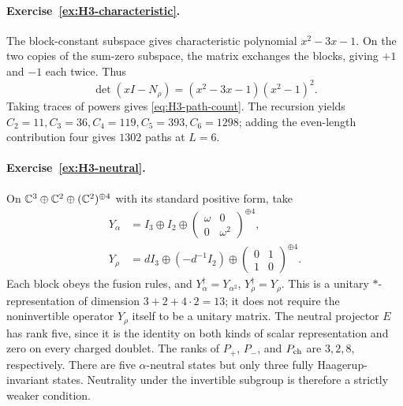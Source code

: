 \paragraph{Exercise~\ref{ex:H3-characteristic}.}
\label{sol:ex:H3-characteristic}
The block-constant subspace gives characteristic polynomial
$x^2-3x-1$.  On the two copies of the sum-zero subspace, the
matrix exchanges the blocks, giving $+1$ and $-1$ each twice.
Thus
\[
 \det(xI-N_\rho)=(x^2-3x-1)(x^2-1)^2.
\]
Taking traces of powers gives \eqref{eq:H3-path-count}.
The recursion yields
$C_2=11,C_3=36,C_4=119,C_5=393,C_6=1298$; adding the
even-length contribution four gives $1302$ paths at $L=6$.



\paragraph{Exercise~\ref{ex:H3-neutral}.}
\label{sol:ex:H3-neutral}
On $\mathbb C^3\oplus\mathbb C^2\oplus(\mathbb C^2)^{\oplus4}$ with its standard
positive form, take
\begin{align*}
 Y_\alpha&=I_3\oplus I_2\oplus
     \begin{pmatrix}\omega&0\\0&\omega^2\end{pmatrix}^{\oplus4},\\
 Y_\rho&=dI_3\oplus(-d^{-1}I_2)\oplus
     \begin{pmatrix}0&1\\1&0\end{pmatrix}^{\oplus4}.
\end{align*}
Each block obeys the fusion rules, and
$Y_\alpha^\dagger=Y_{\alpha^2}$, $Y_\rho^\dagger=Y_\rho$.
This is a unitary $*$-representation of dimension
$3+2+4\cdot2=13$; it does not require the noninvertible operator
$Y_\rho$ itself to be a unitary matrix.
The neutral projector $E$ has rank five, since it is the identity
on both kinds of scalar representation and zero on every charged
doublet.  The ranks of $P_+$, $P_-$, and $P_{\rm ch}$ are
$3,2,8$, respectively.  There are five $\alpha$-neutral states
but only three fully Haagerup-invariant states.  Neutrality under
the invertible subgroup is therefore a strictly weaker condition.


